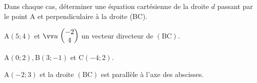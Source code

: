 \documentclass[12pt,a4paper]{article}  %
\begin{document}
Dans chaque cas, déterminer une équation cartésienne de la droite $d$ passant par le point $\mathrm{A}$ et perpendiculaire à la droite (BC).
\begin{enumMet}
    \item {} $\mathrm{A}(5 ; 4)$ et $\Coord{u}{-2}{4}$ un vecteur directeur de $(\mathrm{BC})$.
    \item $\mathrm{A}(0 ; 2), \mathrm{B}(3 ;-1)$ et $\mathrm{C}(-4 ; 2)$.
    \item $\mathrm{A}(-2 ; 3)$ et la droite $(\mathrm{BC})$ est parallèle à l'axe des abscisses.
\end{enumMet}
\end{document}
